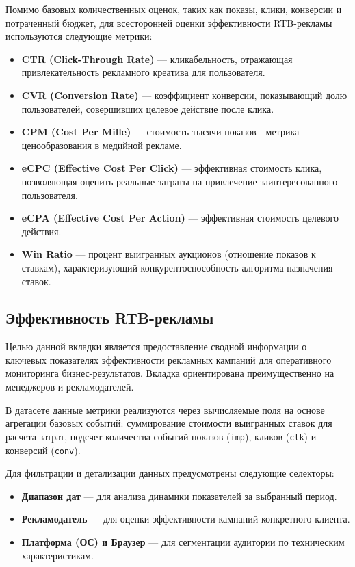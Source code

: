 Помимо базовых количественных оценок, таких как показы, клики, конверсии и потраченный бюджет, для всесторонней оценки эффективности RTB-рекламы используются следующие метрики:
\begin{itemize}
    \item \textbf{CTR (Click-Through Rate)} — кликабельность, отражающая привлекательность рекламного креатива для пользователя.
    \item \textbf{CVR (Conversion Rate)} — коэффициент конверсии, показывающий долю пользователей, совершивших целевое действие после клика.
    \item \textbf{CPM (Cost Per Mille)} — стоимость тысячи показов - метрика ценообразования в медийной рекламе.
    \item \textbf{eCPC (Effective Cost Per Click)} — эффективная стоимость клика, позволяющая оценить реальные затраты на привлечение заинтересованного пользователя.
    \item \textbf{eCPA (Effective Cost Per Action)} — эффективная стоимость целевого действия.
    \item \textbf{Win Ratio} — процент выигранных аукционов (отношение показов к ставкам), характеризующий конкурентоспособность алгоритма назначения ставок.
\end{itemize}

\subsection{Эффективность RTB-рекламы}
\label{subsec:dashboard_metrics}

Целью данной вкладки является предоставление сводной информации о ключевых показателях эффективности рекламных кампаний для оперативного мониторинга бизнес-результатов. Вкладка ориентирована преимущественно на менеджеров и рекламодателей.

В датасете данные метрики реализуются через вычисляемые поля на основе агрегации базовых событий: суммирование стоимости выигранных ставок для расчета затрат, подсчет количества событий показов (\texttt{imp}), кликов (\texttt{clk}) и конверсий (\texttt{conv}).

Для фильтрации и детализации данных предусмотрены следующие селекторы:
\begin{itemize}
    \item \textbf{Диапазон дат} — для анализа динамики показателей за выбранный период.
    \item \textbf{Рекламодатель} — для оценки эффективности кампаний конкретного клиента.
    \item \textbf{Платформа (ОС) и Браузер} — для сегментации аудитории по техническим характеристикам.
\end{itemize}

